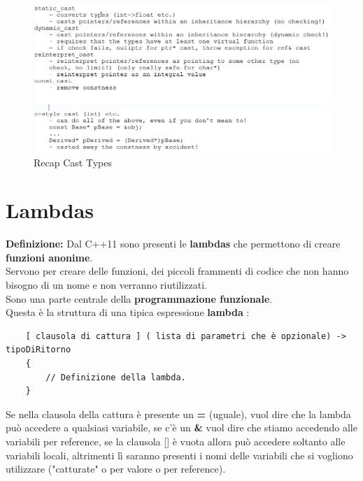 \begin{figure}[ht]
	\centering
	\includegraphics[width=1.2\textwidth, height=1.2\textheight, keepaspectratio]{./imgs/cast_types_recap_static_dynamic_reinterpret_const_c-style2.png}
	\caption{Recap Cast Types}
	\label{fig:cast_types_recap_static_dynamic_reinterpret_const_c-style2}
\end{figure}



\section{Lambdas}

\textsf{\small \textbf{Definizione:} Dal C++11 sono presenti le \textbf{lambdas} che permettono di creare \textbf{funzioni anonime}.} \\

\textsf{\small Servono per creare delle funzioni, dei piccoli frammenti di codice che non hanno bisogno di un nome e non verranno riutilizzati. } \\ %

\textsf{\small Sono una parte centrale della \textbf{programmazione funzionale}.} \\

\textsf{\small Questa è la struttura di una tipica espressione \textbf{lambda} :} \\

\begin{lstlisting}
	[ clausola di cattura ] ( lista di parametri che è opzionale) -> tipoDiRitorno
	{
		// Definizione della lambda.
	}
\end{lstlisting}

\textsf{\small Se nella clausola della cattura è presente un \textbf{=} (uguale), vuol dire che la lambda può accedere a qualsiasi variabile, se c'è un \textbf{\&} vuol dire che stiamo accedendo alle variabili per reference, se la clausola [] è vuota allora può accedere soltanto alle variabili locali, altrimenti lì saranno presenti i nomi delle variabili che si vogliono utilizzare ("catturate" o per valore o per reference).} \\ %


